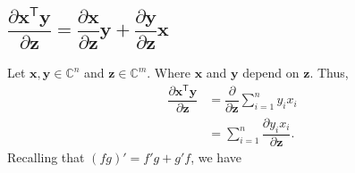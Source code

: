 \documentclass{article}
\newcommand{\trans}{\mathsf{T}}
\begin{document}
\subsection{\(\dfrac{\partial \mathbf{x}^\trans \mathbf{y}}{\partial \mathbf{z}} = \dfrac{\partial \mathbf{x}}{\partial \mathbf{z}}\mathbf{y} + \dfrac{\partial \mathbf{y}}{\partial \mathbf{z}}\mathbf{x}\)}
Let \(\mathbf{x},\mathbf{y} \in \mathbb{C}^{n}\) and \(\mathbf{z} \in \mathbb{C}^{m}\). Where \(\mathbf{x}\) and \(\mathbf{y}\) depend on \(\mathbf{z}\). Thus,
\begin{align}
    \dfrac{\partial \mathbf{x}^\trans \mathbf{y}}{\partial \mathbf{z}} & = \dfrac{\partial}{\partial \mathbf{z}}\sum_{i=1}^{n} y_ix_i \\
    & = \sum_{i=1}^{n} \dfrac{\partial y_ix_i}{\partial \mathbf{z}}.
\end{align}
Recalling that \((fg)' = f'g + g'f\), we have
\end{document}
